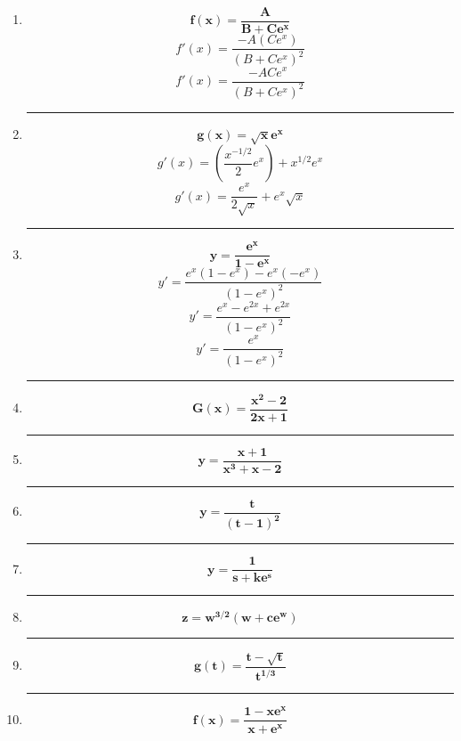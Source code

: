 \documentclass[12pt]{article}
\begin{document}
\begin{enumerate}[label=\textbf{\arabic*)}]
            \hrule\item \[\bm{f(x) = \frac{A}{B + Ce^x}}\]
                \[f'(x) = \frac{- A(Ce^x)}{(B + Ce^x)^2}\]
                \[f'(x) = \frac{- ACe^x}{(B + Ce^x)^2}\]

            \hrule\item \[\bm{g(x) = \sqrt{x} e^x}\]
                \[g'(x) = \left(\frac{x^{-1/2}}{2} e^x\right) + x^{1/2} e^x\]
                \[g'(x) = \frac{e^x}{2\sqrt{x}} + e^x \sqrt{x}\]

            \hrule\item \[\bm{y = \frac{e^x}{1 - e^x}}\]
                \[y' = \frac{e^x(1 - e^x) - e^x(-e^x)}{(1 - e^x)^2}\]
                \[y' = \frac{e^x - e^{2x} + e^{2x}}{(1 - e^x)^2}\]
                \[y' = \frac{e^x}{(1 - e^x)^2}\]

            \hrule\item \[\bm{G(x) = \frac{x^2 - 2}{2x + 1}}\]
            \hrule\item \[\bm{y = \frac{x + 1}{x^3 + x - 2}}\]
            \hrule\item \[\bm{y = \frac{t}{(t - 1)^2}}\]
            \hrule\item \[\bm{y = \frac{1}{s + ke^s}}\]
            \hrule\item \[\bm{z = w^{3/2} (w + ce^w)}\]
            \hrule\item \[\bm{g(t) = \frac{t - \sqrt{t}}{t^{1/3}}}\]
            \hrule\item \[\bm{f(x) = \frac{1 - xe^x}{x + e^x}}\]
        \end{enumerate}


\end{document}
